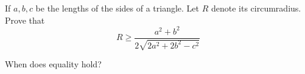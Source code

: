 If $a,b,c$ be the lengths of the sides of a triangle. Let $R$ denote its circumradius. Prove that\[ R\ge \frac{a^2+b^2}{2\sqrt{2a^2+2b^2-c^2}}\]

When does equality hold?